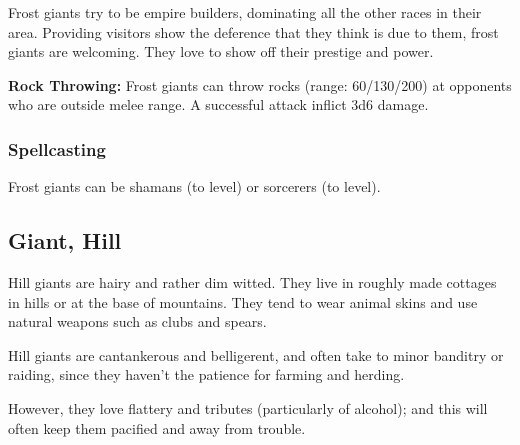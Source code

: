 \begin{multicols*}{2}
Frost giants try to be empire builders, dominating all the other races in their area. Providing visitors show the deference that they think is due to them, frost giants are welcoming. They love to show off their prestige and power.

\textbf{Rock Throwing:} Frost giants can throw rocks (range: 60/130/200) at opponents who are outside melee range. A successful attack inflict 3d6 damage.

\subsubsection{Spellcasting}
Frost giants can be shamans (to  level) or sorcerers (to  level).

\subsection{Giant, Hill}

Hill giants are hairy and rather dim witted. They live in roughly made cottages in hills or at the base of mountains. They tend to wear animal skins and use natural weapons such as clubs and spears.

Hill giants are cantankerous and belligerent, and often take to minor banditry or raiding, since they haven’t the patience for farming and herding.

However, they love flattery and tributes (particularly of alcohol); and this will often keep them pacified and away from trouble.


\end{multicols*}

